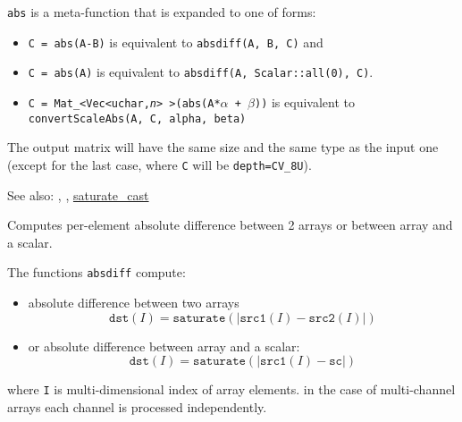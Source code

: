 
\begin{description}
\end{description}

\texttt{abs} is a meta-function that is expanded to one of  forms:

\begin{itemize}
    \item \texttt{C = abs(A-B)} is equivalent to \texttt{absdiff(A, B, C)} and
    \item \texttt{C = abs(A)} is equivalent to \texttt{absdiff(A, Scalar::all(0), C)}.
    \item \texttt{C = Mat\_<Vec<uchar,\emph{n}> >(abs(A*$\alpha$ + $\beta$))} is equivalent to \texttt{convertScaleAbs(A, C, alpha, beta)}
\end{itemize}

The output matrix will have the same size and the same type as the input one
(except for the last case, where \texttt{C} will be \texttt{depth=CV\_8U}).

See also: , , \hyperref[cppfunc.saturatecast]{saturate\_cast}

Computes per-element absolute difference between 2 arrays or between array and a scalar.


\begin{description}
\end{description}

The functions \texttt{absdiff} compute:
\begin{itemize}
    \item absolute difference between two arrays
    \[\texttt{dst}(I) = \texttt{saturate}(|\texttt{src1}(I) - \texttt{src2}(I)|)\]
    \item or absolute difference between array and a scalar:
    \[\texttt{dst}(I) = \texttt{saturate}(|\texttt{src1}(I) - \texttt{sc}|)\]
\end{itemize}
where \texttt{I} is multi-dimensional index of array elements.
in the case of multi-channel arrays each channel is processed independently.

